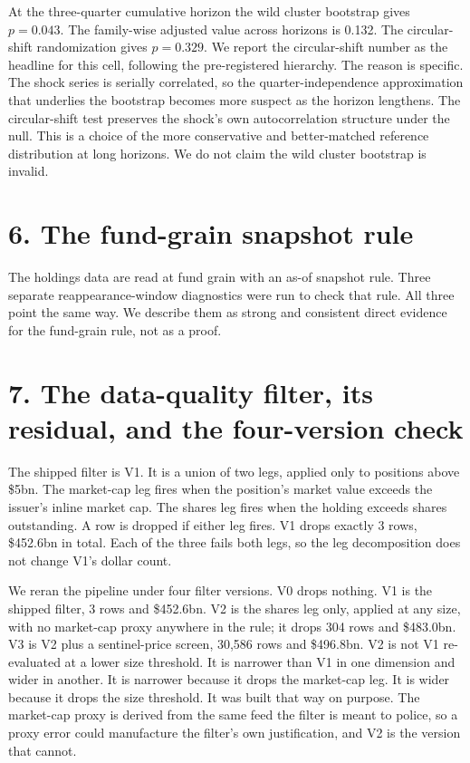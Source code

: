\documentclass[11pt]{article}
\begin{document}
At the three-quarter cumulative horizon the wild cluster bootstrap gives
$p = 0.043$. The family-wise adjusted value across horizons is 0.132. The
circular-shift randomization gives $p = 0.329$. We report the circular-shift
number as the headline for this cell, following the pre-registered hierarchy.
The reason is specific. The shock series is serially correlated, so the
quarter-independence approximation that underlies the bootstrap becomes more
suspect as the horizon lengthens. The circular-shift test preserves the
shock's own autocorrelation structure under the null. This is a choice of the
more conservative and better-matched reference distribution at long horizons.
We do not claim the wild cluster bootstrap is invalid.

\section*{6. The fund-grain snapshot rule}

The holdings data are read at fund grain with an as-of snapshot rule. Three
separate reappearance-window diagnostics were run to check that rule. All
three point the same way. We describe them as strong and consistent direct
evidence for the fund-grain rule, not as a proof.

\section*{7. The data-quality filter, its residual, and the four-version check}

The shipped filter is V1. It is a union of two legs, applied only to positions
above \$5bn. The market-cap leg fires when the position's market value exceeds
the issuer's inline market cap. The shares leg fires when the holding exceeds
shares outstanding. A row is dropped if either leg fires. V1 drops exactly 3
rows, \$452.6bn in total. Each of the three fails both legs, so the leg
decomposition does not change V1's dollar count.

We reran the pipeline under four filter versions. V0 drops nothing. V1 is the
shipped filter, 3 rows and \$452.6bn. V2 is the shares leg only, applied at
any size, with no market-cap proxy anywhere in the rule; it drops 304 rows and
\$483.0bn. V3 is V2 plus a sentinel-price screen, 30,586 rows and \$496.8bn.
V2 is not V1 re-evaluated at a lower size threshold. It is narrower than V1 in
one dimension and wider in another. It is narrower because it drops the
market-cap leg. It is wider because it drops the size threshold. It was built
that way on purpose. The market-cap proxy is derived from the same feed the
filter is meant to police, so a proxy error could manufacture the filter's own
justification, and V2 is the version that cannot.
\end{document}
